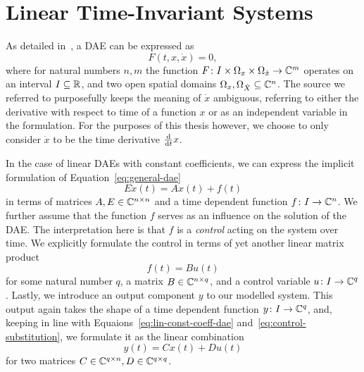 \section{Linear Time-Invariant Systems}\label{sec:ltis}

As detailed in~\cite{Kunkel2006}, a \acf{DAE} can be expressed as
\begin{equation}\label{eq:general-dae}
    F(t, x, \dot{x}) = 0,
\end{equation}
where for natural numbers $n, m$ the function $F \colon I \times \Omega_x \times \Omega_{\dot{x}} \to \mathbb{C}^m$ operates on an interval $I \subseteq \mathbb{R}$, and two open spatial domains $\Omega_x, \Omega_{\dot{X}} \subseteq \mathbb{C}^n$.
The source we referred to purposefully keeps the meaning of $\dot{x}$ ambiguous, referring to either the derivative with respect to time of a function $x$ or as an independent variable in the formulation.
For the purposes of this thesis however, we choose to only consider $\dot{x}$ to be the time derivative $\frac{\mathop{}\!\mathrm{d}}{\mathop{}\!\mathrm{d} t} x$.

In the case of linear \acp{DAE} with constant coefficients, we can express the implicit formulation of Equation~\eqref{eq:general-dae}
\begin{equation}\label{eq:lin-const-coeff-dae}
    E \dot{x}(t) = A x(t) + f(t)
\end{equation}
in terms of matrices $A, E \in \mathbb{C}^{n \times n}$ and a time dependent function $f \colon I \to \mathbb{C}^n$.
We further assume that the function $f$ serves as an influence on the solution of the \ac{DAE}.
The interpretation here is that $f$ is a \emph{control} acting on the system over time.
We explicitly formulate the control in terms of yet another linear matrix product
\begin{equation}\label{eq:control-substitution}
    f(t) = B u(t)
\end{equation}
for some natural number $q$, a matrix $B \in \mathbb{C}^{n \times q}$, and a control variable $u \colon I \to \mathbb{C}^q$.
Lastly, we introduce an output component $y$ to our modelled system.
This output again takes the shape of a time dependent function $y \colon I \to \mathbb{C}^q$, and, keeping in line with Equaions~\eqref{eq:lin-const-coeff-dae} and~\eqref{eq:control-substitution}, we formulate it as the linear combination
\begin{equation}\label{eq:output-definition}
    y(t) = C x(t) + D u(t)
\end{equation}
for two matrices $C \in \mathbb{C}^{q \times n}, D \in \mathbb{C}^{q \times q}$.

